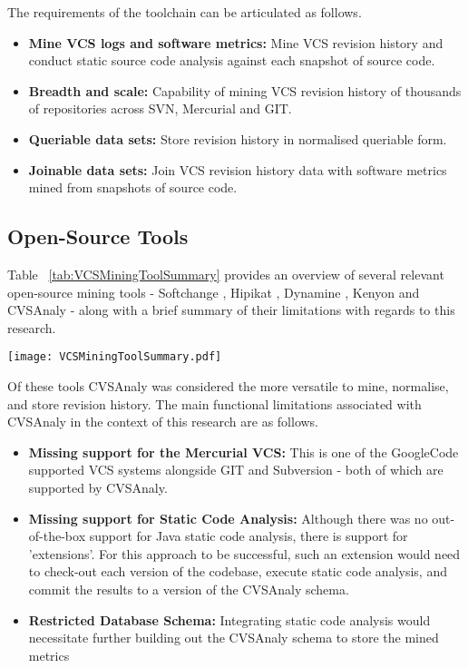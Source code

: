 The requirements of the toolchain can be articulated as follows.
\begin{itemize}
\item \textbf{Mine VCS logs and software metrics:} Mine VCS revision history and conduct static source code analysis against each snapshot of source code.
\item \textbf{Breadth and scale:} Capability of mining VCS revision history of thousands of repositories across SVN, Mercurial and GIT.
\item \textbf{Queriable data sets:} Store revision history in normalised queriable form.
\item \textbf{Joinable data sets:} Join VCS revision history data with software metrics mined from snapshots of source code.
\end{itemize}

\subsection{Open-Source Tools}
Table ~\ref{tab:VCSMiningToolSummary} provides an overview of several relevant open-source mining tools - Softchange \citep{german2004mining}, Hipikat \citep{vcubranic2003hipikat}, Dynamine \citep{livshits2005dynamine}, Kenyon \citep{bevan2005facilitating} and CVSAnaly \citep{robles2004remote} - along with a brief summary of their limitations with regards to this research.

\begin{table}
\centering 
{}
\begin{tabular}
 \centering 
 \texttt{[image: VCSMiningToolSummary.pdf]}
 \label{tab:VCSMiningToolSummary}
\end{tabular}
\end{table}

Of these tools CVSAnaly was considered the more versatile to mine, normalise, and store revision history. The main functional limitations associated with CVSAnaly in the context of this research are as follows.

\begin{itemize}
\item \textbf{Missing support for the Mercurial VCS:} This is one of the GoogleCode supported VCS systems alongside GIT and Subversion - both of which are supported by CVSAnaly.
\item \textbf{Missing support for Static Code Analysis:} Although there was no out-of-the-box support for Java static code analysis, there is support for 'extensions'. For this approach to be successful, such an extension would need to check-out each version of the codebase, execute static code analysis, and commit the results to a version of the CVSAnaly schema.
\item \textbf{Restricted Database Schema:} Integrating static code analysis would necessitate further building out the CVSAnaly schema to store the mined metrics 
\end{itemize}

